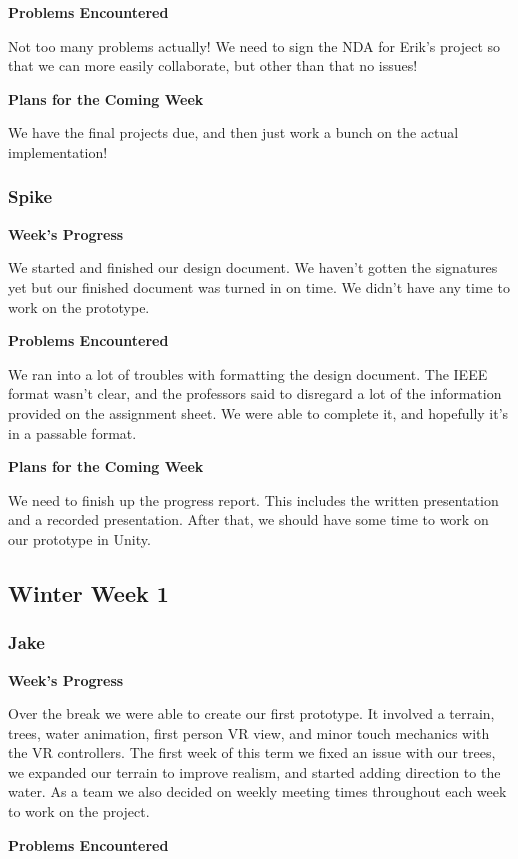 \documentclass[10pt,journal,compsoc,onecolumn, draftclsnofoot]{IEEEtran}
\begin{document}
\noindent \textbf{Problems Encountered}

Not too many problems actually! We need to sign the NDA for Erik's project so that we can more easily collaborate, but other than that no issues!

\noindent \textbf{Plans for the Coming Week}

We have the final projects due, and then just work a bunch on the actual implementation!

\subsubsection{Spike}
\noindent \textbf{Week's Progress}

We started and finished our design document. We haven't gotten the signatures yet but our finished document was turned in on time. We didn't have any time to work on the prototype.

\noindent \textbf{Problems Encountered}

We ran into a lot of troubles with formatting the design document. The IEEE format wasn't clear, and the professors said to disregard a lot of the information provided on the assignment sheet. We were able to complete it, and hopefully it's in a passable format.

\noindent \textbf{Plans for the Coming Week}

We need to finish up the progress report. This includes the written presentation and a recorded presentation. After that, we should have some time to work on our prototype in Unity.

\subsection{Winter Week 1}
\subsubsection{Jake}
\noindent \textbf{Week's Progress}

Over the break we were able to create our first prototype. It involved a terrain, trees, water animation, first person VR view, and minor touch mechanics with the VR controllers. The first week of this term we fixed an issue with our trees, we expanded our terrain to improve realism, and started adding direction to the water. As a team we also decided on weekly meeting times throughout each week to work on the project.

\noindent \textbf{Problems Encountered}
\end{document}
